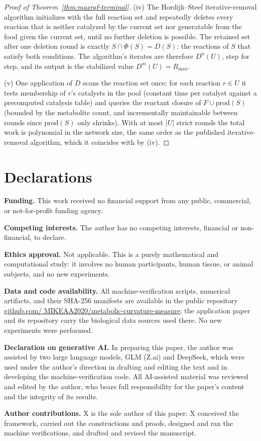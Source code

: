 \documentclass[11pt,a4paper]{article}
\theoremstyle{plain}
\theoremstyle{definition}
\theoremstyle{remark}
\begin{document}
\begin{proof}[Proof of Theorem~\ref{thm:maxraf-terminal}]
(iv) The Hordijk--Steel iterative-removal algorithm initializes
with the full reaction set and repeatedly deletes every reaction
that is neither catalyzed by the current set nor generatable from
the food given the current set, until no further deletion is
possible. The retained set after one deletion round is exactly
$S\cap\Phi(S)=D(S)$: the reactions of $S$ that satisfy both
conditions. The algorithm's iterates are therefore
$D^{n}(U)$, step for step, and its output is the stabilized
value $D^{m}(U)=R_{\max}$.

(v) One application of $D$ scans the reaction set once; for each
reaction $r\in U$ it tests membership of $r$'s catalysts in the
pool (constant time per catalyst against a precomputed catalysis
table) and queries the reactant closure of
$F\cup\mathrm{prod}(S)$ (bounded by the metabolite count, and
incrementally maintainable between rounds since
$\mathrm{prod}(S)$ only shrinks). With at most $|U|$ strict
rounds the total work is polynomial in the network size, the same
order as the published iterative-removal algorithm, which it
coincides with by (iv).
\end{proof}

\section*{Declarations}
\noindent\textbf{Funding.} This work received no financial support
from any public, commercial, or not-for-profit funding agency.

\smallskip
\noindent\textbf{Competing interests.} The author has no
competing interests, financial or non-financial, to declare.

\smallskip
\noindent\textbf{Ethics approval.} Not applicable. This is a purely
mathematical and computational study: it involves no human
participants, human tissue, or animal subjects, and no new
experiments.

\smallskip
\noindent\textbf{Data and code availability.} All
machine-verification scripts, numerical artifacts, and their SHA-256
manifests are available in the public repository
\href{https://github.com/MIKEAA2020/metabolic-curvature-measure}{github.com/
MIKEAA2020/metabolic-curvature-measure}; the application paper
\citep{zai2026measure} and its repository carry the biological data
sources used there. No new experiments were performed.

\smallskip
\noindent\textbf{Declaration on generative AI.} In preparing this
paper, the author was assisted by two large language models, GLM
(Z.ai) and DeepSeek, which were used under the author's direction in
drafting and editing the text and in developing the
machine-verification code. All AI-assisted material was reviewed and
edited by the author, who bears full responsibility for the paper's
content and the integrity of its results.

\smallskip
\noindent\textbf{Author contributions.} X is the sole author of this
paper: X conceived the framework, carried out the constructions and
proofs, designed and ran the machine verifications, and drafted and
revised the manuscript.



\end{document}
